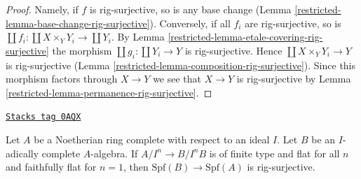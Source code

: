 \begin{proof}

Namely, if $f$ is rig-surjective, so is any base change
(Lemma \ref{restricted-lemma-base-change-rig-surjective}).
Conversely, if all $f_i$ are rig-surjective, so is
$\coprod f_i : \coprod X \times_Y Y_i \to \coprod Y_i$.
By Lemma \ref{restricted-lemma-etale-covering-rig-surjective}
the morphism $\coprod g_i : \coprod Y_i \to Y$ is rig-surjective.
Hence $\coprod X \times_Y Y_i \to Y$ is rig-surjective
(Lemma \ref{restricted-lemma-composition-rig-surjective}).
Since this morphism factors through $X \to Y$ we see that $X \to Y$
is rig-surjective by Lemma \ref{restricted-lemma-permanence-rig-surjective}.
\end{proof}

\begin{lemma}
\label{restricted-lemma-faithfully-flat-rig-surjective}
\href{https://stacks.math.columbia.edu/tag/0AQX}{\texttt{Stacks tag 0AQX}}

Let $A$ be a Noetherian ring complete with respect to an ideal $I$.
Let $B$ be an $I$-adically complete $A$-algebra.
If $A/I^n \to B/I^nB$ is of finite type and flat for all $n$ and
faithfully flat for $n = 1$, then $\text{Spf}(B) \to \text{Spf}(A)$
is rig-surjective.
\end{lemma}

